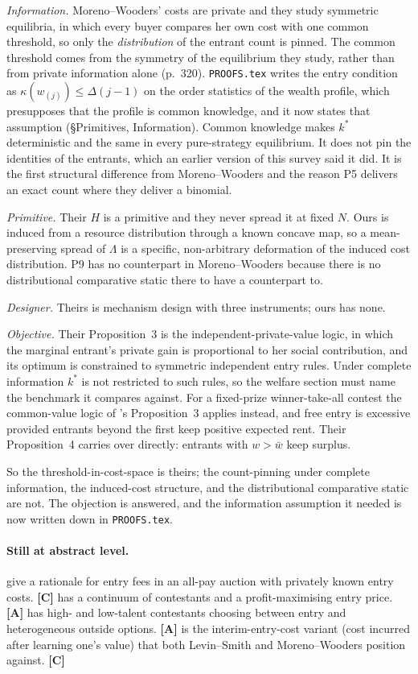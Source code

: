 \documentclass[11pt,a4paper]{article}
\begin{document}
\emph{Information.} Moreno--Wooders' costs are private and they study
symmetric equilibria, in which every buyer compares her own cost with one
common threshold, so only the \emph{distribution} of the entrant count is
pinned. The common threshold comes from the symmetry of the equilibrium they
study, rather than from private information alone (p.~320).
\texttt{PROOFS.tex} writes the entry condition as
$\kappa(w_{(j)}) \leq \Delta(j-1)$ on the order statistics of the wealth
profile, which presupposes that the profile is common knowledge, and it now
states that assumption (\S Primitives, Information). Common knowledge makes
$k^*$ deterministic and the same in every pure-strategy equilibrium. It does
not pin the identities of the entrants, which an earlier version of this survey
said it did. It is the first structural difference from Moreno--Wooders and the
reason P5 delivers an exact count where they deliver a binomial.

\emph{Primitive.} Their $H$ is a primitive and they never spread it at fixed
$N$. Ours is
induced from a resource distribution through a known concave map, so a
mean-preserving spread of $\Lambda$ is a specific, non-arbitrary deformation
of the induced cost distribution. P9 has no counterpart in Moreno--Wooders
because there is no distributional comparative static there to have a
counterpart to.

\emph{Designer.} Theirs is mechanism design with three instruments; ours has
none.

\emph{Objective.} Their Proposition~3 is the independent-private-value logic,
in which the marginal entrant's private gain is proportional to her social
contribution, and its optimum is constrained to symmetric independent entry
rules. Under complete information $k^*$ is not restricted to such rules, so the
welfare section must name the benchmark it compares against. For a fixed-prize
winner-take-all contest the common-value logic of \citet{LevinSmith1994}'s
Proposition~3 applies instead, and free entry is excessive provided entrants
beyond the first keep positive expected rent. Their Proposition~4 carries over
directly: entrants with $w > \bar w$ keep surplus.

So the threshold-in-cost-space is theirs; the count-pinning under complete
information, the induced-cost structure, and the distributional comparative
static are not. The objection is answered, and the information assumption it
needed is now written down in \texttt{PROOFS.tex}.

\paragraph{Still at abstract level.} \citet{KaplanSela2010} give a rationale
for entry fees in an all-pay auction with privately known entry costs.
\textbf{[C]} \citet{Ginzburg2021} has a continuum of contestants and a
profit-maximising entry price. \textbf{[A]} \citet{GrossmannDietl2015} has
high- and low-talent contestants choosing between entry and heterogeneous
outside options. \textbf{[A]} \citet{Samuelson1985} is the interim-entry-cost
variant (cost incurred after learning one's value) that both Levin--Smith and
Moreno--Wooders position against. \textbf{[C]}
\end{document}
